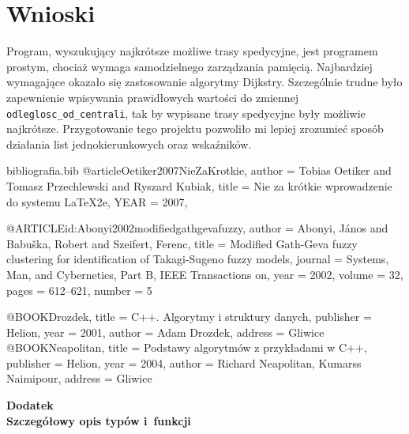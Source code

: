 \documentclass[12pt,a4paper,twoside]{article}
\begin{document}
\section{Wnioski}

Program, wyszukujący najkrótsze możliwe trasy spedycyjne, jest programem prostym, chociaż wymaga samodzielnego zarządzania pamięcią. Najbardziej wymagające okazało się zastosowanie algorytmy Dijkstry. Szczególnie trudne było zapewnienie wpisywania prawidłowych wartości do zmiennej \lstinline!odleglosc_od_centrali!, tak by wypisane trasy spedycyjne były możliwie najkrótsze. Przygotowanie tego projektu pozwoliło mi lepiej zrozumieć sposób działania list jednokierunkowych oraz wskaźników.



 

\begin{filecontents}{bibliografia.bib}
@article{Oetiker2007NieZaKrotkie,
	author       = {Tobias Oetiker and Tomasz Przechlewski and Ryszard Kubiak},
	title       = {Nie za kr\'{o}tkie wprowadzenie do systemu {L}a{T}e{X}2e}},
	YEAR         = {2007},


@ARTICLE{id:Abonyi2002modifiedgathgevafuzzy,
  author = {Abonyi, J\'{a}nos and Babu\v{s}ka, Robert and Szeifert, Ferenc},
  title = {{Modified Gath-Geva fuzzy clustering for identification of Takagi-Sugeno
	fuzzy models}},
  journal = {Systems, Man, and Cybernetics, Part B, IEEE Transactions on},
  year = {2002},
  volume = {32},
  pages = {612--621},
  number = {5}
}

@BOOK{Drozdek,
  title = {C++. Algorytmy i struktury danych},
  publisher = {Helion},
  year = {2001},
  author = {Adam Drozdek},
  address = {Gliwice}
}
@BOOK{Neapolitan,
	title = {Podstawy algorytm\'{o}w z przykładami w C++},
	publisher = {Helion},
	year = {2004},
	author = {Richard Neapolitan, Kumarss Naimipour},
	address = {Gliwice}
}
\end{filecontents}






 
\cleardoublepage

\rule{0cm}{0cm}

\vfill

\begin{center}
\Huge\bfseries Dodatek\\Szczegółowy opis typów i~funkcji\par
\end{center}

\vfill 

\rule{0cm}{0cm}
\end{document}

